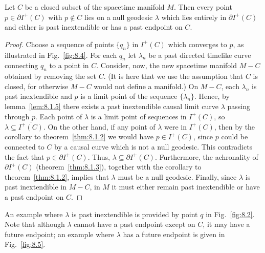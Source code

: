 \begin{theorem}\label{thm:8.1.6}
Let \(C\) be a closed subset of the spacetime manifold \(M\). Then every point
\(p\in\partial I^+(C)\) with \(p\notin C\) lies on a null geodesic \(\lambda\)
which lies entirely in \(\partial I^+(C)\) and either is past inextendible or has a
past endpoint on \(C\).
\end{theorem}
\begin{proof}
Choose a sequence of points \(\{q_n\}\) in \(I^+(C)\) which converges to \(p\), as
illustrated in Fig.~\ref{fig:8.4}. For each \(q_n\) let \(\lambda_n\) be a past
directed timelike curve connecting \(q_n\) to a point in \(C\). Consider, now, the
new spacetime manifold \(M-C\) obtained by removing the set \(C\). (It is here that
we use the assumption that \(C\) is closed, for otherwise \(M-C\) would not define a
manifold.) On \(M-C\), each \(\lambda_n\) is past inextendible and \(p\) is a limit
point of the sequence \(\{\lambda_n\}\). Hence, by lemma~\ref{lem:8.1.5} there
exists a past inextendible causal limit curve \(\lambda\) passing through \(p\). Each
point of \(\lambda\) is a limit point of sequences in \(I^+(C)\), so
\(\lambda\subseteq\overline{I^+(C)}\). On the other hand, if any point of
\(\lambda\) were in \(I^+(C)\), then by the corollary to theorem~\ref{thm:8.1.2}
we would have \(p\in I^+(C)\), since \(p\) could be connected to \(C\) by a causal
curve which is not a null geodesic. This contradicts the fact that
\(p\in\partial I^+(C)\). Thus, \(\lambda\subseteq\partial I^+(C)\). Furthermore,
the achronality of \(\partial I^+(C)\) (theorem~\ref{thm:8.1.3}), together with the
corollary to theorem~\ref{thm:8.1.2}, implies that \(\lambda\) must be a null
geodesic. Finally, since \(\lambda\) is past inextendible in \(M-C\), in \(M\) it
must either remain past inextendible or have a past endpoint on \(C\).
\end{proof}



An example where \(\lambda\) is past inextendible is provided by point \(q\) in
Fig.~\ref{fig:8.2}. Note that although \(\lambda\) cannot have a past endpoint
except on \(C\), it may have a future endpoint; an example where \(\lambda\) has a
future endpoint is given in Fig.~\ref{fig:8.5}.


